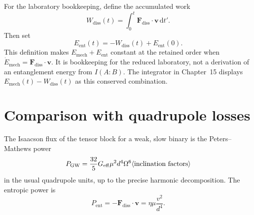 For the laboratory bookkeeping, define the accumulated work
\begin{equation}
  \label{eq:Wdiss}
  W_{\mathrm{diss}}(t)
  =\int_0^t\mathbf{F}_{\mathrm{diss}}\cdot\mathbf{v}\,\mathrm{d}t'.
\end{equation}
Then set
\begin{equation}
  \label{eq:Eent-lab}
  E_{\mathrm{ent}}(t)=-W_{\mathrm{diss}}(t)+E_{\mathrm{ent}}(0).
\end{equation}
This definition makes \(E_{\mathrm{mech}}+E_{\mathrm{ent}}\)
constant at the retained order when
\(\dot E_{\mathrm{mech}}=\mathbf{F}_{\mathrm{diss}}\cdot\mathbf v\).
It is bookkeeping for the reduced laboratory, not a derivation of
an entanglement energy from \(I(A:B)\). The integrator in
Chapter~15 displays \(E_{\mathrm{mech}}(t)-W_{\mathrm{diss}}(t)\)
as this conserved combination.

\section{Comparison with quadrupole losses}
\label{sec:ch14-quad}

The Isaacson flux of the tensor block for a weak, slow binary is
the Peters--Mathews power~\cite{PetersMathews1963,Peters1964}
\begin{equation}
  \label{eq:Peters}
  P_{\mathrm{GW}}
  =\frac{32}{5}G_{\mathrm{eff}}\mu^2 d^4\Omega^6
   \langle\text{inclination factors}\rangle
\end{equation}
in the usual quadrupole units, up to the precise harmonic
decomposition. The entropic power is
\begin{equation}
  \label{eq:Pent}
  P_{\mathrm{ent}}
  =-\mathbf{F}_{\mathrm{diss}}\cdot\mathbf{v}
  =\eta\mu\frac{v^2}{d^4}.
\end{equation}

